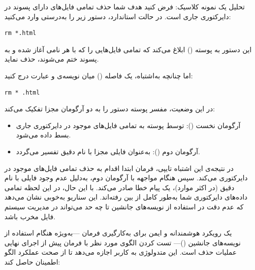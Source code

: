 تحلیل یک نمونه کلاسیک: فرض کنید هدف شما حذف تمامی فایل‌های دارای پسوند  در دایرکتوری جاری است. در حالت استاندارد، دستور زیر را به‌درستی وارد می‌کنید:

\begin{latin}
\begin{lstlisting}
rm *.html
\end{lstlisting}
\end{latin}

این دستور به پوسته () ابلاغ می‌کند که تمامی فایل‌هایی را که با هر نامی آغاز شده و به پسوند  ختم می‌شوند، حذف نماید.

اما چنانچه به‌اشتباه، یک فاصله () میان نویسه‌ی \cmd{*} و عبارت  درج کنید:

\begin{latin}
\begin{lstlisting}
rm * .html
\end{lstlisting}
\end{latin}

در این وضعیت، مفسر پوسته دستور را به دو آرگومان مجزا تفکیک می‌کند:

\begin{itemize}
  \item آرگومان نخست (\cmd{*}): توسط پوسته به تمامی فایل‌های موجود در دایرکتوری جاری بسط داده می‌شود.
  \item آرگومان دوم (): به‌عنوان فایلی مجزا با نام دقیق  تفسیر می‌گردد.
\end{itemize}

در نتیجه‌ی این اشتباه تایپی، فرمان  ابتدا اقدام به حذف تمامی فایل‌های موجود در دایرکتوری می‌کند. سپس هنگام مواجهه با آرگومان دوم، به‌دلیل عدم وجود فایلی با نام دقیق  (در اکثر موارد)، یک پیام خطا صادر می‌کند. با این حال، در این لحظه تمامی داده‌های دایرکتوری شما به‌طور کامل از بین رفته‌اند. این سناریو به‌خوبی نشان می‌دهد که عدم دقت در استفاده از نویسه‌های جانشین تا چه حد می‌تواند در مدیریت سیستم‌ فایل مخرب باشد.

یک رویکرد هوشمندانه و ایمن برای به‌کارگیری فرمان  —به‌ویژه هنگام استفاده از نویسه‌های جانشین ()— تست کردن الگوی مورد نظر با فرمان  پیش از اجرای نهایی عملیات حذف است. این متدولوژی به کاربر اجازه می‌دهد تا از صحت عملکرد الگو اطمینان حاصل کند:


